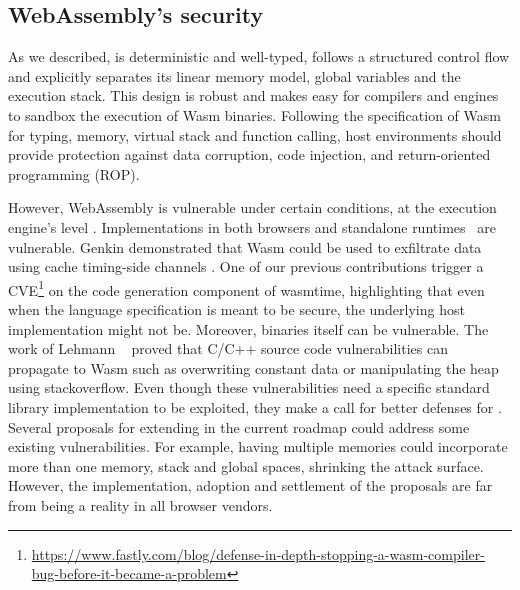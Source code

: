 







\subsection*{WebAssembly's security}

As we described, \wasm is deterministic and well-typed, follows a structured control flow and explicitly separates its linear memory model, global variables and the execution stack. This design is robust \cite{WebAssemblySecurity} and makes easy for compilers and engines to sandbox the execution of Wasm binaries. Following the specification of Wasm for typing, memory, virtual stack and function calling,
host environments should provide protection against data corruption, code injection, and return-oriented programming (ROP).

However, WebAssembly is vulnerable under certain conditions, at the execution engine's level \cite{ChromeZero}.
Implementations in both browsers and standalone runtimes~\cite{Narayan2021Swivel} are vulnerable.
Genkin \etal demonstrated that Wasm could be used to exfiltrate data using cache timing-side channels \cite{Genkin2018DrivebyKC}.
One of our previous contributions trigger a CVE\footnote{\url{https://www.fastly.com/blog/defense-in-depth-stopping-a-wasm-compiler-bug-before-it-became-a-problem}} on the code generation component of wasmtime, highlighting that even when the language specification is meant to be secure, the underlying host implementation might not be. 
Moreover, binaries itself can be vulnerable. The work of Lehmann \etal ~\cite{usenixWasm2020} proved that C/C++ source code vulnerabilities can propagate to Wasm such as overwriting constant data or manipulating the heap using stackoverflow. Even though these vulnerabilities need a specific standard library implementation to be exploited, they make a call for better defenses for \wasm. 
Several proposals for extending \wasm in the current roadmap could address some existing vulnerabilities. For example, having multiple memories could incorporate more than one memory, stack and global spaces, shrinking the attack surface. However, the implementation, adoption and settlement of the proposals are far from being a reality in all browser vendors.

